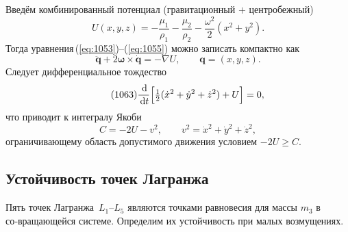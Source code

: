 \documentclass[12pt]{article}
\newcommand{\omegav}{\boldsymbol{\omega}}
\newcommand{\muone}{\mu_1}
\newcommand{\mutwo}{\mu_2}
\newcommand{\dd}{\,\mathrm d}
\begin{document}
Введём комбинированный потенциал (гравитационный $+$ центробежный)
\begin{equation}\tag{1059}\label{eq:U}
  U(x,y,z) = -\frac{\muone}{\rho_1}-\frac{\mutwo}{\rho_2}-\frac{\omega^{2}}{2}(x^{2}+y^{2}).
\end{equation}
Тогда уравнения\,(\ref{eq:1053})–(\ref{eq:1055}) можно записать компактно как
\begin{equation}\tag{1056--1058}
  \ddot {\mathbf q} + 2\omegav\times\dot{\mathbf q} = -\nabla U,\qquad \mathbf q=(x,y,z).
\end{equation}
Следует дифференциальное тождество
\begin{equation}\tag{1063}\label{eq:jacobi}
  \frac{\dd}{\dd t}\Bigl[\tfrac12(\dot x^{2}+\dot y^{2}+\dot z^{2})+U\Bigr]=0,
\end{equation}
что приводит к интегралу Якоби
\begin{equation}\tag{1064}
  C = -2U-v^{2},\qquad v^{2}=\dot x^{2}+\dot y^{2}+\dot z^{2},
\end{equation}
ограничивающему область допустимого движения условием $-2U\ge C$. \par
\bigskip

\subsection{Устойчивость точек Лагранжа}\label{sec:stability}

Пять точек Лагранжа~$L_1$–$L_5$ являются точками равновесия для массы $m_3$ в со‑вращающейся системе. Определим их устойчивость при малых возмущениях.
\end{document}
